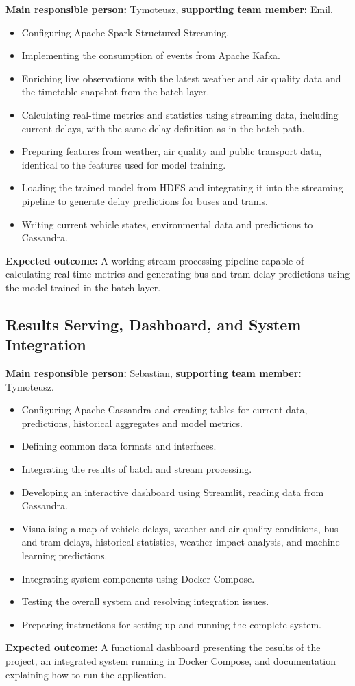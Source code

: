 \documentclass[11pt]{article}
\begin{document}
\textbf{Main responsible person:} Tymoteusz, \textbf{supporting team member:} Emil.

\begin{itemize}
    \item Configuring Apache Spark Structured Streaming.
    \item Implementing the consumption of events from Apache Kafka.
    \item Enriching live observations with the latest weather and air quality data and the timetable snapshot from the batch layer.
    \item Calculating real-time metrics and statistics using streaming data, including current delays, with the same delay definition as in the batch path.
    \item Preparing features from weather, air quality and public transport data, identical to the features used for model training.
    \item Loading the trained model from HDFS and integrating it into the streaming pipeline to generate delay predictions for buses and trams.
    \item Writing current vehicle states, environmental data and predictions to Cassandra.
\end{itemize}
\textbf{Expected outcome:} A working stream processing pipeline capable of calculating real-time metrics and generating bus and tram delay predictions using the model trained in the batch layer.

\subsection{Results Serving, Dashboard, and System Integration}

\textbf{Main responsible person:} Sebastian, \textbf{supporting team member:} Tymoteusz.

\begin{itemize}
    \item Configuring Apache Cassandra and creating tables for current data, predictions, historical aggregates and model metrics.
    \item Defining common data formats and interfaces.
    \item Integrating the results of batch and stream processing.
    \item Developing an interactive dashboard using Streamlit, reading data from Cassandra.
    \item Visualising a map of vehicle delays, weather and air quality conditions, bus and tram delays, historical statistics, weather impact analysis, and machine learning predictions.
    \item Integrating system components using Docker Compose.
    \item Testing the overall system and resolving integration issues.
    \item Preparing instructions for setting up and running the complete system.
\end{itemize}
\textbf{Expected outcome:} A functional dashboard presenting the results of the project, an integrated system running in Docker Compose, and documentation explaining how to run the application.
\end{document}
